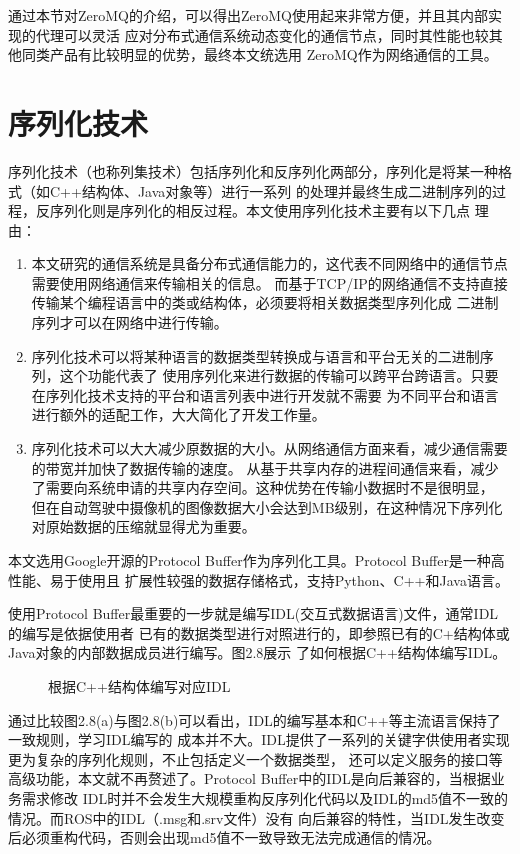通过本节对ZeroMQ的介绍，可以得出ZeroMQ使用起来非常方便，并且其内部实现的代理可以灵活
应对分布式通信系统动态变化的通信节点，同时其性能也较其他同类产品有比较明显的优势，最终本文统选用
ZeroMQ作为网络通信的工具。

\section{序列化技术}
序列化技术（也称列集技术）包括序列化和反序列化两部分，序列化是将某一种格式（如C++结构体、Java对象等）进行一系列
的处理并最终生成二进制序列的过程，反序列化则是序列化的相反过程\cite{zj,wangbinbin}。本文使用序列化技术主要有以下几点
理由：
\begin{enumerate}
  \item 本文研究的通信系统是具备分布式通信能力的，这代表不同网络中的通信节点需要使用网络通信来传输相关的信息。
  而基于TCP/IP的网络通信不支持直接传输某个编程语言中的类或结构体，必须要将相关数据类型序列化成
  二进制序列才可以在网络中进行传输。
  \item 序列化技术可以将某种语言的数据类型转换成与语言和平台无关的二进制序列，这个功能代表了
  使用序列化来进行数据的传输可以跨平台跨语言。只要在序列化技术支持的平台和语言列表中进行开发就不需要
  为不同平台和语言进行额外的适配工作，大大简化了开发工作量。
  \item 序列化技术可以大大减少原数据的大小。从网络通信方面来看，减少通信需要的带宽并加快了数据传输的速度。
  从基于共享内存的进程间通信来看，减少了需要向系统申请的共享内存空间。这种优势在传输小数据时不是很明显，
  但在自动驾驶中摄像机的图像数据大小会达到MB级别，在这种情况下序列化对原始数据的压缩就显得尤为重要。
\end{enumerate}
本文选用Google开源的Protocol Buffer作为序列化工具。Protocol Buffer是一种高性能、易于使用且
扩展性较强的数据存储格式，支持Python、C++和Java语言\cite{sxy}。

使用Protocol Buffer最重要的一步就是编写IDL(交互式数据语言)文件，通常IDL的编写是依据使用者
已有的数据类型进行对照进行的，即参照已有的C+结构体或Java对象的内部数据成员进行编写。图2.8展示
了如何根据C++结构体编写IDL。
\begin{figure}[H]
  \centering
  \caption{根据C++结构体编写对应IDL}
  \label{Fig.11}
\end{figure}
通过比较图2.8(a)与图2.8(b)可以看出，IDL的编写基本和C++等主流语言保持了一致规则，学习IDL编写的
成本并不大。IDL提供了一系列的关键字供使用者实现更为复杂的序列化规则，不止包括定义一个数据类型，
还可以定义服务的接口等高级功能，本文就不再赘述了。Protocol Buffer中的IDL是向后兼容的，当根据业务需求修改
IDL时并不会发生大规模重构反序列化代码以及IDL的md5值不一致的情况。而ROS中的IDL（.msg和.srv文件）没有
向后兼容的特性，当IDL发生改变后必须重构代码，否则会出现md5值不一致导致无法完成通信的情况。

